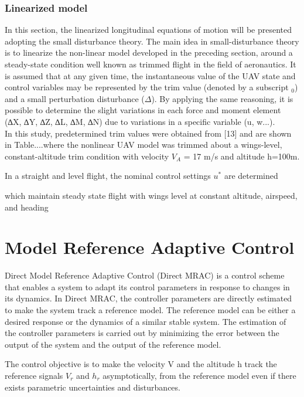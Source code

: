 \documentclass[12pt]{article}
\begin{document}
\subsubsection{Linearized model}

In this section, the linearized longitudinal equations of motion will be presented adopting the small disturbance theory. The main idea in small-disturbance theory is to linearize the non-linear model developed in the preceding section, around a steady-state condition well known as trimmed flight in the field of aeronautics. It is assumed that at any given time, the instantaneous value of the UAV state and control variables may be represented by the trim value (denoted by a subscript $_0$) and a small perturbation disturbance ($\Delta$). By applying the same reasoning, it is possible to determine the slight variations in each force and moment element (∆X, ∆Y, ∆Z, ∆L, ∆M, ∆N) due to variations in a specific variable (u, w...). \\

In this study, predetermined trim values were obtained from [13] and are shown in Table....where the nonlinear UAV model was trimmed about a wings-level, constant-altitude 
trim condition with velocity $V_A$ = 17 m/s and altitude h=100m.

In a straight and level flight, the nominal control settings $u^*$ are determined 

which maintain steady state flight with wings level at constant altitude, airspeed, and heading






\section{Model Reference Adaptive Control}
Direct Model Reference Adaptive Control (Direct MRAC)
is a control scheme that enables a system to adapt its control
parameters in response to changes in its dynamics. In Direct
MRAC, the controller parameters are directly estimated to
make the system track a reference model. The reference model
can be either a desired response or the dynamics of a similar
stable system. The estimation of the controller parameters is
carried out by minimizing the error between the output of the
system and the output of the reference model.

The control objective is to make the velocity V and the altitude h track the reference signals $V_r$ and $h_r$ asymptotically, from the reference model even if there exists parametric uncertainties and disturbances.
\end{document}
